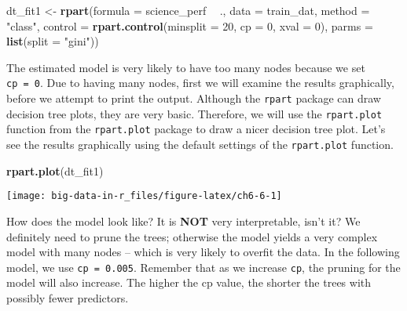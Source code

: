\documentclass[]{book}
\newenvironment{Shaded}{\begin{snugshade}}{\end{snugshade}}
\newcommand{\DataTypeTok}[1]{\textcolor[rgb]{0.13,0.29,0.53}{#1}}
\newcommand{\DecValTok}[1]{\textcolor[rgb]{0.00,0.00,0.81}{#1}}
\newcommand{\KeywordTok}[1]{\textcolor[rgb]{0.13,0.29,0.53}{\textbf{#1}}}
\newcommand{\NormalTok}[1]{#1}
\newcommand{\OperatorTok}[1]{\textcolor[rgb]{0.81,0.36,0.00}{\textbf{#1}}}
\newcommand{\StringTok}[1]{\textcolor[rgb]{0.31,0.60,0.02}{#1}}
\begin{document}
\begin{Shaded}
\begin{Highlighting}[]
\NormalTok{dt_fit1 <-}\StringTok{ }\KeywordTok{rpart}\NormalTok{(}\DataTypeTok{formula =}\NormalTok{ science_perf }\OperatorTok{~}\StringTok{ }\NormalTok{.,}
                 \DataTypeTok{data =}\NormalTok{ train_dat,}
                 \DataTypeTok{method =} \StringTok{"class"}\NormalTok{, }
                 \DataTypeTok{control =} \KeywordTok{rpart.control}\NormalTok{(}\DataTypeTok{minsplit =} \DecValTok{20}\NormalTok{, }
                                         \DataTypeTok{cp =} \DecValTok{0}\NormalTok{, }
                                         \DataTypeTok{xval =} \DecValTok{0}\NormalTok{),}
                \DataTypeTok{parms =} \KeywordTok{list}\NormalTok{(}\DataTypeTok{split =} \StringTok{"gini"}\NormalTok{))}
\end{Highlighting}
\end{Shaded}

The estimated model is very likely to have too many nodes because we set \texttt{cp\ =\ 0}. Due to having many nodes, first we will examine the results graphically, before we attempt to print the output. Although the \texttt{rpart} package can draw decision tree plots, they are very basic. Therefore, we will use the \texttt{rpart.plot} function from the \texttt{rpart.plot} package to draw a nicer decision tree plot. Let's see the results graphically using the default settings of the \texttt{rpart.plot} function.

\begin{Shaded}
\begin{Highlighting}[]
\KeywordTok{rpart.plot}\NormalTok{(dt_fit1)}
\end{Highlighting}
\end{Shaded}

\texttt{[image: big-data-in-r\_files/figure-latex/ch6-6-1]}

How does the model look like? It is \textbf{NOT} very interpretable, isn't it? We definitely need to prune the trees; otherwise the model yields a very complex model with many nodes -- which is very likely to overfit the data. In the following model, we use \texttt{cp\ =\ 0.005}. Remember that as we increase \texttt{cp}, the pruning for the model will also increase. The higher the cp value, the shorter the trees with possibly fewer predictors.
\end{document}
